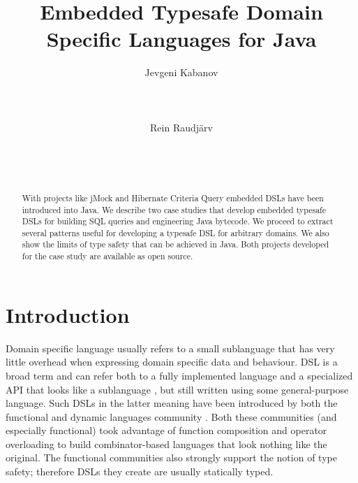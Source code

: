 \documentclass{sig-alternate}
\begin{document}
\title{Embedded Typesafe Domain Specific Languages for Java} 

\author{
	\alignauthor 
		Jevgeni Kabanov\\
       \\
       \\
       \\
	\alignauthor 
		Rein Raudj\"arv\\
       \\
       \\
       \\
}

\date{}

\maketitle

\begin{abstract}
With projects like jMock and Hibernate Criteria Query embedded DSLs have been introduced into Java. We describe two case studies that develop embedded typesafe DSLs for building SQL queries and engineering Java bytecode. We proceed to extract several patterns useful for developing a typesafe DSL for arbitrary domains. We also show the limits of type safety that can be achieved in Java. Both projects developed for the case study are available as open source.
\end{abstract}


\section{Introduction}

Domain specific language usually refers to a small sublanguage that has very little overhead when expressing domain specific data and behaviour. DSL is a broad term \cite{vandeursen2000dsl,bentley1999pp} and can refer both to a fully implemented language and a specialized API that looks like a sublanguage \cite{hudak1996}, but still written using some general-purpose language. Such DSLs in the latter meaning have been introduced by both the functional \cite{bringert2004sph} and dynamic languages community \cite{cuadrado2007bds}. Both these communities (and especially functional) took advantage of function composition and operator overloading to build combinator-based languages that look nothing like the original. The functional communities also strongly support the notion of type safety; therefore DSLs they create are usually statically typed.
\end{document}
